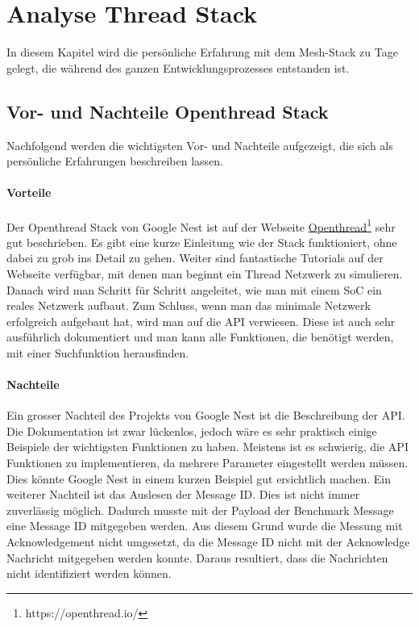\clearpage
\section{Analyse Thread Stack}\label{sec:AnalyseThreadStack}
In diesem Kapitel wird die persönliche Erfahrung mit dem Mesh-Stack zu Tage gelegt, die während des ganzen Entwicklungsprozesses entstanden ist.

\subsection{Vor- und Nachteile Openthread Stack}\label{susec:ThreadVorNachteile}
Nachfolgend werden die wichtigsten Vor- und Nachteile aufgezeigt, die sich als persönliche Erfahrungen beschreiben lassen.
\paragraph{Vorteile}
Der Openthread Stack von Google Nest ist auf der Webseite \href{https://openthread.io/}{Openthread\footnote{\url{https://openthread.io/}}} sehr gut beschrieben. Es gibt eine kurze Einleitung wie der Stack funktioniert, ohne dabei zu grob ins Detail zu gehen. Weiter sind fantastische Tutorials auf der Webseite verfügbar, mit denen man beginnt ein Thread Netzwerk zu simulieren. Danach wird man Schritt für Schritt angeleitet, wie man  mit einem SoC ein reales Netzwerk aufbaut. Zum Schluss, wenn man das minimale Netzwerk erfolgreich aufgebaut hat, wird man auf die API verwiesen. Diese ist auch sehr ausführlich dokumentiert und man kann alle Funktionen, die benötigt werden, mit einer Suchfunktion herausfinden.

\paragraph{Nachteile}
Ein grosser Nachteil des Projekts von Google Nest ist die Beschreibung der API. Die Dokumentation ist zwar lückenlos, jedoch wäre es sehr praktisch einige Beispiele der wichtigsten Funktionen zu haben. Meistens ist es schwierig, die API Funktionen zu implementieren, da mehrere Parameter eingestellt werden müssen. Dies könnte Google Nest in einem kurzen Beispiel gut ersichtlich machen. Ein weiterer Nachteil ist das Auslesen der Message ID. Dies ist nicht immer zuverlässig möglich. Dadurch musste mit der Payload der Benchmark Message eine Message ID mitgegeben werden. Aus diesem Grund wurde die Messung mit Acknowledgement nicht umgesetzt, da die Message ID nicht mit der Acknowledge Nachricht mitgegeben werden konnte. Daraus resultiert, dass die Nachrichten nicht identifiziert werden können.

